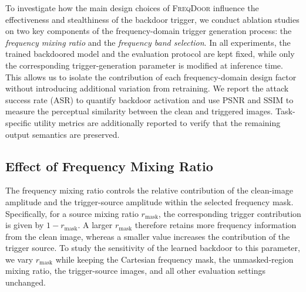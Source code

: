 \documentclass[lettersize,journal]{IEEEtran}
\begin{document}
To investigate how the main design choices of \textsc{FreqDoor} influence the effectiveness and stealthiness of the backdoor trigger, we conduct ablation studies on two key components of the frequency-domain trigger generation process: the \emph{frequency mixing ratio} and the \emph{frequency band selection}. In all experiments, the trained backdoored model and the evaluation protocol are kept fixed, while only the corresponding trigger-generation parameter is modified at inference time. This allows us to isolate the contribution of each frequency-domain design factor without introducing additional variation from retraining. We report the attack success rate (ASR) to quantify backdoor activation and use PSNR and SSIM to measure the perceptual similarity between the clean and triggered images. Task-specific utility metrics are additionally reported to verify that the remaining output semantics are preserved.

\subsection{Effect of Frequency Mixing Ratio} \label{subsec:ablation_ratio} The frequency mixing ratio controls the relative contribution of the clean-image amplitude and the trigger-source amplitude within the selected frequency mask. Specifically, for a source mixing ratio $r_{\mathrm{mask}}$, the corresponding trigger contribution is given by $1-r_{\mathrm{mask}}$. A larger $r_{\mathrm{mask}}$ therefore retains more frequency information from the clean image, whereas a smaller value increases the contribution of the trigger source. To study the sensitivity of the learned backdoor to this parameter, we vary $r_{\mathrm{mask}}$ while keeping the Cartesian frequency mask, the unmasked-region mixing ratio, the trigger-source images, and all other evaluation settings unchanged. 
\end{document}
